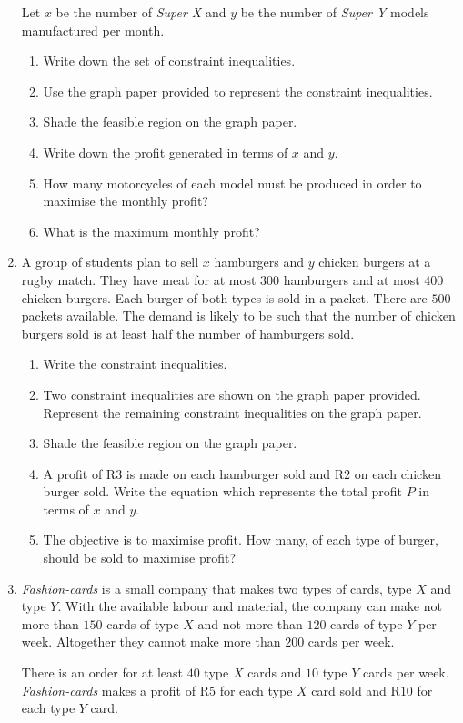 \begin{enumerate}
{Let $x$ be the number of \textit{Super X} and $y$ be the number of \textit{Super Y} models
manufactured per month.

\begin{enumerate}
\item{Write down the set of constraint inequalities.}
\item{Use the graph paper provided to represent the constraint inequalities.}
\item{Shade the feasible region on the graph paper.}
\item{Write down the profit generated in terms of $x$ and $y$.}
\item{How many motorcycles of each model must be produced in order to maximise the monthly profit?}
\item{What is the maximum monthly profit?}
\end{enumerate}
}
\item{A group of students plan to sell $x$ hamburgers and $y$ chicken burgers at a rugby match. They have meat for at most $300$ hamburgers and at most $400$ chicken burgers. Each burger of
both types is sold in a packet. There are $500$ packets available. The demand is likely to be such that the number of chicken burgers sold is at least half the number of hamburgers sold.
\begin{enumerate}
\item{Write the constraint inequalities.}
\item{Two constraint inequalities are shown on the graph paper provided. Represent the remaining constraint inequalities on the graph paper.}
\item{Shade the feasible region on the graph paper.}
\item{A profit of R$3$ is made on each hamburger sold and R$2$ on each chicken burger sold. Write the equation which represents the total profit $P$ in terms of $x$ and $y$.}
\item{The objective is to maximise profit. How many, of each type of burger, should be sold to maximise profit?}
\end{enumerate}}

\item{\textit{Fashion-cards} is a small company that makes two types of cards, type $X$ and type $Y$. With the available labour and material, the company can make not more than $150$ cards of type $X$ and not more than $120$ cards of type $Y$ per week. Altogether they cannot make more than $200$ cards per week.

There is an order for at least $40$ type $X$ cards and $10$ type $Y$ cards per week.
\textit{Fashion-cards} makes a profit of R$5$ for each type $X$ card sold and R$10$ for each type $Y$ card.

}
\end{enumerate}
